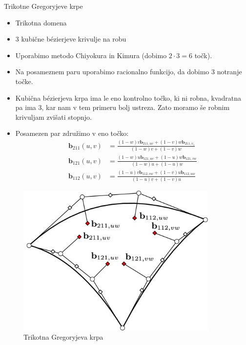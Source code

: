 \documentclass[a4paper,8pt]{beamer}
\newcommand{\tbf}{\textbf}
\begin{document}
\begin{frame}{Trikotne Gregoryjeve krpe}
	\begin{itemize}
		\item Trikotna domena
		\item 3 kubične bézierjeve krivulje na robu
		\item Uporabimo metodo Chiyokura in Kimura (dobimo $2 \cdot 3 = 6$ točk).
		\item Na posameznem paru uporabimo racionalno funkcijo, da dobimo 3 notranje točke.
		\item Kubična bézierjeva krpa ima le eno kontrolno točko, ki ni robna, kvadratna pa ima 3, kar nam v tem primeru bolj ustreza. Zato moramo še robnim krivuljam zvišati stopnjo.
		\item Posamezen par združimo v eno točko:
		\begin{align*}
		\tbf{b}_{211} (u, v) &= \frac{(1-w)v \tbf{b}_{211,uv}+(1-v)w\tbf{b}_{211,v_1}}{(1-w)v+(1-v)w} \\
		\tbf{b}_{121} (u, v) &= \frac{(1-w)u \tbf{b}_{121,uv}+(1-u)w\tbf{b}_{121,vw}}{(1-w)u+(1-u)w} \\
		\tbf{b}_{112} (u, v) &= \frac{(1-u)v \tbf{b}_{112,vw}+(1-v)u\tbf{b}_{112,uw}}{(1-u)v+(1-v)u} 
		\end{align*}
	\end{itemize}
\end{frame}
\begin{frame}
	\begin{figure}[h]
		\centering
		\includegraphics[width=10cm]{gregory_krpe_trikotna.jpg}
		\caption{Trikotna Gregoryjeva krpa}
	\end{figure}
\end{frame}
\end{document}
